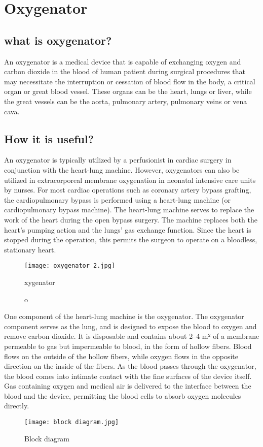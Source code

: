 \documentclass[11pt]{article}
\begin{document}
\section{\Huge Oxygenator}
\subsection{what is oxygenator?}
\Large An oxygenator is a medical device that is capable of exchanging oxygen and carbon dioxide in the blood of human patient during surgical procedures that may necessitate the interruption or cessation of blood flow in the body, a critical organ or great blood vessel. These organs can be the heart, lungs or liver, while the great vessels can be the aorta, pulmonary artery, pulmonary veins or vena cava.
\subsection{How it is useful?}
\Large \raggedright An oxygenator is typically utilized by a perfusionist in cardiac surgery in conjunction with the heart-lung machine. However, oxygenators can also be utilized in extracorporeal membrane oxygenation in neonatal intensive care units by nurses. For most cardiac operations such as coronary artery bypass grafting, the cardiopulmonary bypass is performed using a heart-lung machine (or cardiopulmonary bypass machine). The heart-lung machine serves to replace the work of the heart during the open bypass surgery. The machine replaces both the heart's pumping action and the lungs' gas exchange function. Since the heart is stopped during the operation, this permits the surgeon to operate on a bloodless, stationary heart.
\begin{figure}[h]

\texttt{[image:  oxygenator 2.jpg]}
\centering

\caption   
oxygenator
\end{figure}

\raggedright One component of the heart-lung machine is the oxygenator. The oxygenator component serves as the lung, and is designed to expose the blood to oxygen and remove carbon dioxide. It is disposable and contains about 2–4 m² of a membrane permeable to gas but impermeable to blood, in the form of hollow fibers. Blood flows on the outside of the hollow fibers, while oxygen flows in the opposite direction on the inside of the fibers. As the blood passes through the oxygenator, the blood comes into intimate contact with the fine surfaces of the device itself. Gas containing oxygen and medical air is delivered to the interface between the blood and the device, permitting the blood cells to absorb oxygen molecules directly.
\begin{figure}
\centering
\texttt{[image: block diagram.jpg]}
\caption{Block diagram}
\end{figure}
\end{document}
